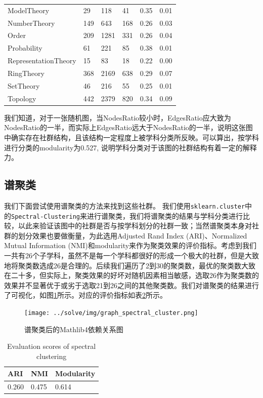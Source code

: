 \begin{table}[h!]
\begin{tabular}{llllll}
    ModelTheory & 29 & 118 & 41 & 0.35 & 0.01\\
    NumberTheory & 149 & 643 & 168 & 0.26 & 0.03\\
    Order & 209 & 1281 & 331 & 0.26 & 0.04\\
    Probability & 61 & 221 & 85 & 0.38 & 0.01\\
    RepresentationTheory & 15 & 83 & 18 & 0.22 & 0.00\\
    RingTheory & 368 & 2169 & 638 & 0.29 & 0.07\\
    SetTheory & 46 & 216 & 55 & 0.25 & 0.01\\
    Topology& 442 & 2379 & 820 & 0.34 & 0.09\\
    \bottomrule
\end{tabular}
\label{tab:Ratio}
\end{table}

我们知道，对于一张随机图，当NodesRatio较小时，EdgesRatio应大致为NodesRatio的一半，而实际上EdgesRatio远大于NodesRatio的一半，说明这张图中确实存在社群结构，且该结构一定程度上被学科分类所反映。可以算出，按学科进行分类的modularity为0.527, 说明学科分类对于该图的社群结构有着一定的解释力。

\subsection{谱聚类}

我们下面尝试使用谱聚类的方法来找到这些社群。
我们使用\texttt{sklearn.cluster}中的\texttt{Spectral-\allowbreak Clustering}来进行谱聚类，我们将谱聚类的结果与学科分类进行比较，以此来验证该图中的社群是否与按学科划分的社群一致；当然谱聚类本身对社群的划分效果也要做衡量，为此选用Adjusted Rand Index (ARI)、Normalized Mutual Information (NMI)和modularity来作为聚类效果的评价指标。考虑到我们一共有26个子学科，虽然不是每一个学科都很好的形成一个极大的社群，但是大致地将聚类数选成26是合理的。后续我们遍历了2到30的聚类数，最优的聚类数大致在二十多，但实际上，聚类效果的好坏对随机因素相当敏感，选取26作为聚类数的效果并不显著优于或劣于选取21到26之间的其他聚类数。我们对谱聚类的结果进行了可视化，如图\ref{fig:clustering}所示。对应的评价指标如表\ref{tab:score}所示。
\begin{figure}[htb]
    \centering
    \texttt{[image: ../solve/img/graph\_spectral\_cluster.png]}
    \caption{谱聚类后的Mathlib4依赖关系图}
    \label{fig:clustering}
\end{figure}
\begin{table}[htb]
  \centering
  \caption{Evaluation scores of spectral clustering}
  \begin{tabular}{lll}
    \toprule
    ARI & NMI & Modularity\\
    \midrule
    0.260 & 0.475 & 0.614\\
    \bottomrule
  \end{tabular}
  \label{tab:score}
\end{table}

